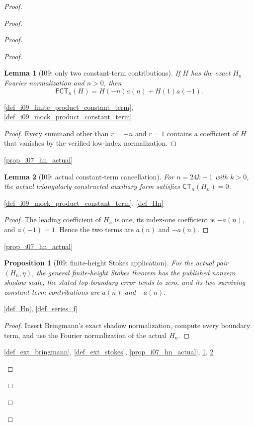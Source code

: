 \documentclass[11pt,a4paper]{article}
\numberwithin{equation}{section}
\theoremstyle{plain}\newtheorem{theorem}{Theorem}[section]\newaliascnt{proposition}{theorem}\newtheorem{proposition}[proposition]{Proposition}\aliascntresetthe{proposition}\newaliascnt{lemma}{theorem}\newtheorem{lemma}[lemma]{Lemma}\aliascntresetthe{lemma}
\theoremstyle{definition}\newaliascnt{definition}{theorem}\newtheorem{definition}[definition]{Definition}\aliascntresetthe{definition}\newaliascnt{notation}{theorem}\newtheorem{notation}[notation]{Notation}\aliascntresetthe{notation}
\providecommand{\lean}[1]{}\providecommand{\leanok}{}
\begin{document}
\begin{proof}
\begin{proof}
\begin{proof}
\begin{proof}
\begin{lemma}[I09: only two constant-term contributions]\label{lem_i09_two_constant_term_contributions}\lean{SptCM.Analytic.Repaired.finiteMockProductConstantTerm_eq_hnMockProductConstantTerm}\leanok
If \(H\) has the exact \(H_n\) Fourier normalization and \(n>0\), then
\[
 \mathsf{FCT}_{n}(H)
 =H(-n)a(n)+H(1)a(-1).
\]
\end{lemma}
\begin{uses-statement}\ref{def_i09_finite_product_constant_term}, \ref{def_i09_mock_product_constant_term}\end{uses-statement}
\begin{proof}
Every summand other than \(r=-n\) and \(r=1\) contains a coefficient of
\(H\) that vanishes by the verified low-index normalization.
\end{proof}
\begin{uses-proof}\ref{prop_i07_hn_actual}\end{uses-proof}

\begin{lemma}[I09: actual constant-term cancellation]\label{lem_i09_constant_term_cancellation}\lean{SptCM.Analytic.Repaired.auxiliaryHn_mockProductConstantTerm_eq_zero}\leanok
For \(n=24k-1\) with \(k>0\), the actual triangularly constructed
auxiliary form satisfies \(\mathsf{CT}_{n}(H_n)=0\).
\end{lemma}
\begin{uses-statement}\ref{def_i09_mock_product_constant_term}, \ref{def_Hn}\end{uses-statement}
\begin{proof}
The leading coefficient of \(H_n\) is one, its index-one coefficient is
\(-a(n)\), and \(a(-1)=1\).  Hence the two terms are \(a(n)\) and
\(-a(n)\).
\end{proof}
\begin{uses-proof}\ref{prop_i07_hn_actual}\end{uses-proof}

\begin{proposition}[I09: finite-height Stokes application]\label{prop_i09_stokes_application}\lean{SptCM.Analytic.Repaired.auxiliaryHn_finiteHeightStokesApplication}\leanok
For the actual pair $(H_n,\eta)$, the general finite-height Stokes theorem has the published nonzero shadow scale, the stated top-boundary error tends to zero, and its two surviving constant-term contributions are $a(n)$ and $-a(n)$.
\end{proposition}
\begin{uses-statement}\ref{def_Hn}, \ref{def_series_f}\end{uses-statement}
\begin{proof}Insert Bringmann's exact shadow normalization, compute every boundary term, and use the Fourier normalization of the actual $H_n$.\end{proof}
\begin{uses-proof}\ref{def_ext_bringmann}, \ref{def_ext_stokes}, \ref{prop_i07_hn_actual}, \ref{lem_i09_two_constant_term_contributions}, \ref{lem_i09_constant_term_cancellation}\end{uses-proof}


\end{proof}
\end{proof}
\end{proof}
\end{proof}
\end{document}
